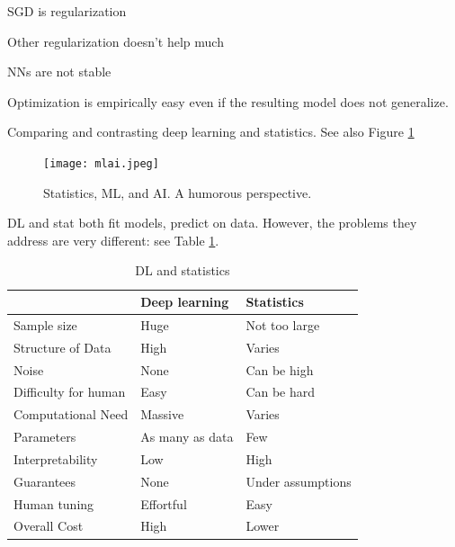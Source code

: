 \documentclass[english]{article}
\begin{document}
\item SGD is regularization

Other regularization doesn't help much

\item NNs are not stable

\item Optimization is  empirically easy even if the resulting model does not generalize. 

\eenum




\item  Comparing and contrasting deep learning and statistics. See also Figure \ref{mlai}

\begin{figure}
  \centering
  \texttt{[image: mlai.jpeg]}
  \caption{Statistics, ML, and AI. A humorous perspective.}
  \label{mlai}
\end{figure}

DL and stat both fit models, predict on data. However, the problems they address are very different: see Table \ref{my-label}.  

\renewcommand{\arraystretch}{1.5}
\begin{table}[]
\centering

\caption{DL and statistics}
\label{my-label}
\begin{tabular}{|l|l|l|}
\hline
                     & Deep learning & Statistics  \\ \hline
Sample size          & Huge          & Not too large       \\\hline  
Structure of Data       & High          & Varies      \\ \hline
Noise       & None          & Can be high      \\ \hline
Difficulty for human & Easy          & Can be hard \\ \hline
Computational Need        & Massive       & Varies      \\ \hline
Parameters    & As many as data          & Few        \\ \hline
Interpretability     & Low           & High        \\ \hline
Guarantees     & None           & Under assumptions        \\ \hline
Human tuning              & Effortful     & Easy        \\ \hline
Overall Cost         & High          & Lower         \\ \hline
\end{tabular}
\end{table}
\end{document}
